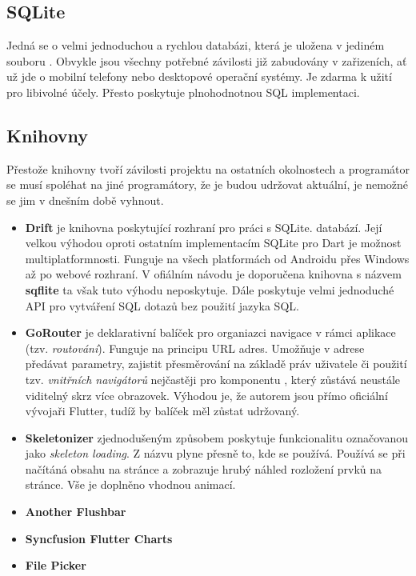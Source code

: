 \documentclass[
  biblatex,
  figures=false,
  tables=false,
  glossaries,
  index
]{kidiplom}
\begin{document}
\subsection{SQLite}
Jedná se o velmi jednoduchou a rychlou databázi, která je uložena v jediném souboru \cite{sqlite}. Obvykle jsou všechny potřebné závilosti již zabudovány v zařizeních, ať už jde o mobilní telefony nebo desktopové operační systémy. Je zdarma k užití pro libivolné účely. Přesto poskytuje plnohodnotnou SQL implementaci.

\subsection{Knihovny}

Přestože knihovny tvoří závilosti projektu na ostatních okolnostech a programátor se musí spoléhat na jiné programátory, že je budou udržovat aktuální, je nemožné se jim v dnešním době vyhnout. 

\begin{itemize}
  \item \textbf{Drift} je knihovna poskytující rozhraní pro práci s SQLite.  databází. Její velkou výhodou oproti ostatním implementacím SQLite pro Dart je možnost multiplatformnosti. Funguje na všech platformách od Androidu přes Windows až po webové rozhraní. V ofiálním návodu je doporučena knihovna s názvem \textbf{sqflite} ta však tuto výhodu neposkytuje. Dále poskytuje velmi jednoduché API pro vytváření SQL dotazů bez použití jazyka SQL.
  \item \textbf{GoRouter} je deklarativní balíček pro organiazci navigace v rámci aplikace (tzv. \textit{routování}). Funguje na principu URL adres. Umožňuje v adrese předávat parametry, zajistit přesměrování na základě práv uživatele či použití tzv. \textit{vnitřních navigátorů} nejčastěji pro komponentu , který zůstává neustále viditelný skrz více obrazovek. Výhodou je, že autorem jsou přímo oficiální vývojaři Flutter, tudíž by balíček měl zůstat udržovaný.
  \item \textbf{Skeletonizer} zjednodušeným způsobem poskytuje funkcionalitu označovanou jako \textit{skeleton loading}. Z názvu plyne přesně to, kde se používá. Používá se při načítáná obsahu na stránce a zobrazuje hrubý náhled rozložení prvků na stránce. Vše je doplněno vhodnou animací. 
  \item \textbf{Another Flushbar}
  \item \textbf{Syncfusion Flutter Charts}
  \item \textbf{File Picker}

\end{itemize}
\end{document}

